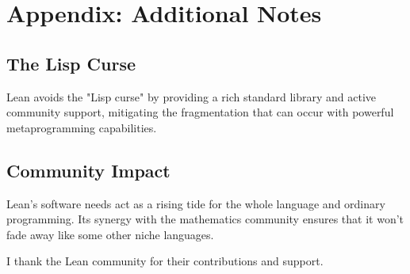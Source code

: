 \documentclass{article}
\begin{document}
\appendix

\section{Appendix: Additional Notes}

\subsection{The Lisp Curse}

Lean avoids the "Lisp curse" by providing a rich standard library and active community support, mitigating the fragmentation that can occur with powerful metaprogramming capabilities.

\subsection{Community Impact}

Lean's software needs act as a rising tide for the whole language and ordinary programming. Its synergy with the mathematics community ensures that it won't fade away like some other niche languages.

\begin{ack}
  I thank the Lean community for their contributions and support.
\end{ack}

\medskip

% 
% 
\end{document}
